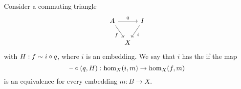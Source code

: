 \begin{defn}
Consider a commuting triangle
\begin{equation*}
\begin{tikzcd}[column sep=tiny]
A \arrow[rr,"q"] \arrow[dr,swap,"f"] & & I \arrow[dl,"i"] \\
& X
\end{tikzcd}
\end{equation*}
with $H:f\sim i\circ q$, where $i$ is an embedding.
We say that $i$ has the  if the map
\begin{equation*}
\mathord{\hspace{1pt}\text{--}\hspace{1pt}}\circ(q,H) : \mathrm{hom}_X(i,m)\to\mathrm{hom}_X(f,m)
\end{equation*}
is an equivalence for every embedding $m:B\to X$. 
\end{defn}

